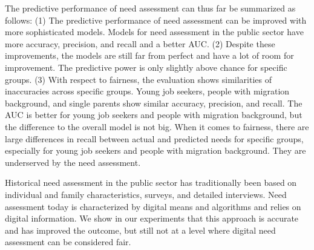 \begin{table}[!ht]
\centering
\caption{Performance of Need Assessment}
\label{tab:prediction}
\end{table}

The predictive performance of need assessment can thus far be summarized as follows: (1) The predictive performance of need assessment can be improved with more sophisticated models. Models for need assessment in the public sector have more accuracy, precision, and recall and a better AUC. (2) Despite these improvements, the models are still far from perfect and have a lot of room for improvement. The predictive power is only slightly above chance for specific groups. (3) With respect to fairness, the evaluation shows similarities of inaccuracies across specific groups. Young job seekers, people with migration background, and single parents show similar accuracy, precision, and recall. The AUC is better for young job seekers and people with migration background, but the difference to the overall model is not big. When it comes to fairness, there are large differences in recall between actual and predicted needs for specific groups, especially for young job seekers and people with migration background. They are underserved by the need assessment.

Historical need assessment in the public sector has traditionally been based on individual and family characteristics, surveys, and detailed interviews. Need assessment today is characterized by digital means and algorithms and relies on digital information. We show in our experiments that this approach is accurate and has improved the outcome, but still not at a level where digital need assessment can be considered fair.
